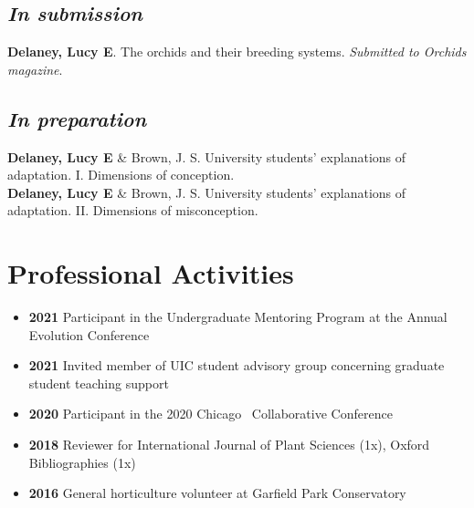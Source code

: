 \documentclass[]{article}
\newlength{\cslhangindent}
\newenvironment{cslreferences}
{\setlength{\parindent}{0pt}
\everypar{\setlength{\hangindent}{\cslhangindent}}\ignorespaces}
{\par}
\begin{document}
\subsection{\fontsize{12}{36}\selectfont \textit{In submission}}
\vspace{-2mm}
\begin{cslreferences}

\textbf{Delaney, Lucy E}. The orchids and their breeding systems. \textit{Submitted to Orchids magazine}.
\end{cslreferences}

\vspace{-4mm}
\subsection{\fontsize{12}{36}\selectfont \textit{In preparation}}
\vspace{-2mm}
\begin{cslreferences}
\textbf{Delaney, Lucy E} \& Brown, J. S. University students' explanations of adaptation. I. Dimensions of conception.\\

\textbf{Delaney, Lucy E} \& Brown, J. S. University students' explanations of adaptation. II. Dimensions of misconception.
\end{cslreferences}
\vspace{8mm}


\section{\fontsize{16}{48}\selectfont Professional Activities}



\begin{itemize}[label=$\mathwitch*$]
\item{\textbf{2021} Participant in the Undergraduate Mentoring Program at the Annual Evolution Conference}
\item{\textbf{2021} Invited member of UIC student advisory group concerning graduate student teaching support}
\item{\textbf{2020} Participant in the 2020 Chicago \faRProject\ Collaborative Conference \href{https://chircollab.github.io/}{\faLink}}
\item{\textbf{2018} Reviewer for International Journal of Plant Sciences (1x), Oxford Bibliographies (1x)}
\item{\textbf{2016} General horticulture volunteer at Garfield Park Conservatory \href{https://garfieldconservatory.org/}{\faLink}}
\end{itemize}
\end{document}
